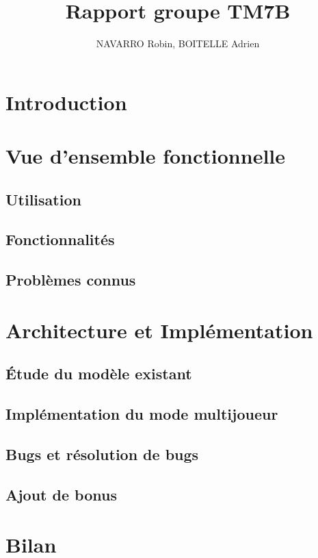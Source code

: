 \documentclass[12pt]{article}
\title{Rapport groupe TM7B}
\author{NAVARRO Robin, BOITELLE Adrien}
\begin{document}
\maketitle

\newpage
\tableofcontents
\newpage

\section{Introduction}
\newpage

\section{Vue d'ensemble fonctionnelle}

\subsection{Utilisation}

\subsection{Fonctionnalités}

\subsection{Problèmes connus}
\newpage

\section{Architecture et Implémentation}
\subsection{Étude du modèle existant}

\subsection{Implémentation du mode multijoueur}

\subsection{Bugs et résolution de bugs}

\subsection{Ajout de bonus}
\newpage

\section{Bilan}
\end{document}
